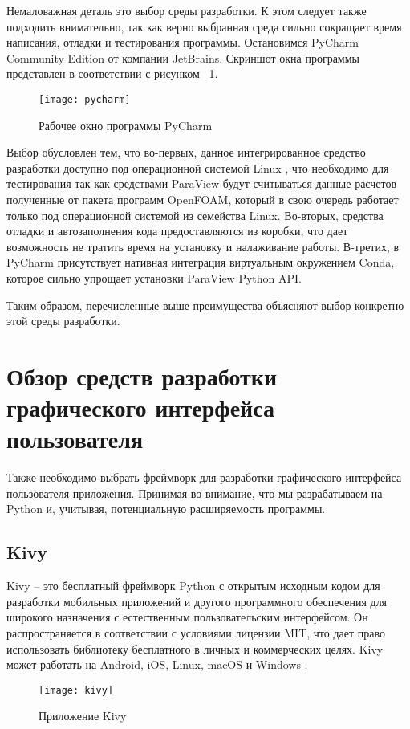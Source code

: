 \documentclass[14pt]{extreport}
\begin{document}
Немаловажная деталь это выбор среды разработки. К этом следует также подходить внимательно, так как верно выбранная среда сильно сокращает время написания, отладки и тестирования программы. Остановимся PyCharm Community Edition от компании JetBrains. Скриншот окна программы представлен в соответствии с рисунком ~\ref{fig12}.

\begin{figure}[H]
	\centerline{\texttt{[image: pycharm]}}
	\caption{Рабочее окно программы PyCharm}
	\label{fig12}
\end{figure}

 Выбор обусловлен тем, что во-первых, данное интегрированное средство разработки доступно под операционной системой Linux \cite{IDEComp}, что необходимо для тестирования так как средствами ParaView будут считываться данные расчетов полученные от пакета программ OpenFOAM, который в свою очередь работает только под операционной системой из семейства Linux. Во-вторых, средства отладки и автозаполнения кода предоставляются из коробки, что дает возможность не тратить время на установку и налаживание работы. В-третих, в PyCharm присутствует нативная интеграция виртуальным окружением Conda, которое сильно упрощает установки ParaView Python API.
 
 Таким образом, перечисленные выше преимущества объясняют выбор конкретно этой среды разработки. 

\section{Обзор средств разработки графического интерфейса пользователя}
Также необходимо выбрать фреймворк для разработки графического интерфейса пользователя приложения. Принимая во внимание, что мы разрабатываем на Python и, учитывая, потенциальную расширяемость программы.  

\subsection{Kivy}
Kivy -- это бесплатный фреймворк Python с открытым исходным кодом для разработки мобильных приложений и другого программного обеспечения для  широкого назначения с естественным пользовательским интерфейсом. Он распространяется в соответствии с условиями лицензии MIT, что дает право использовать библиотеку бесплатного в личных и коммерческих целях. Kivy может работать на Android, iOS, Linux, macOS и Windows \cite{kivy}. 

\begin{figure}[H]
	\centerline{\texttt{[image: kivy]}}
	\caption{Приложение Kivy}
	\label{fig13}
\end{figure}
\end{document}
